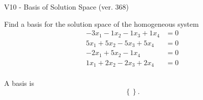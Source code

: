 \begin{exercise}
  \begin{exerciseTitle}V10 - Basis of Solution Space (ver. 368)\end{exerciseTitle}
  \begin{exerciseStatement}
    Find a basis for the solution space of the homogeneous system 
\begin{align*}
 -3 x_ 1 -1 x_ 2 -1 x_ 3 + 1 x_ 4 &= 0  \\ 
  5 x_ 1 + 5 x_ 2 -5 x_ 3 + 5 x_ 4 &= 0  \\ 
  -2 x_ 1 + 5 x_ 2 -1 x_ 4 &= 0  \\ 
  1 x_ 1 + 2 x_ 2 -2 x_ 3 + 2 x_ 4 &= 0  \\ 
 \end{align*}


 
  \end{exerciseStatement}

  \begin{exerciseAnswer}
   A basis is   
\[\left\{\right\}.\]

  


  \end{exerciseAnswer}
\end{exercise}